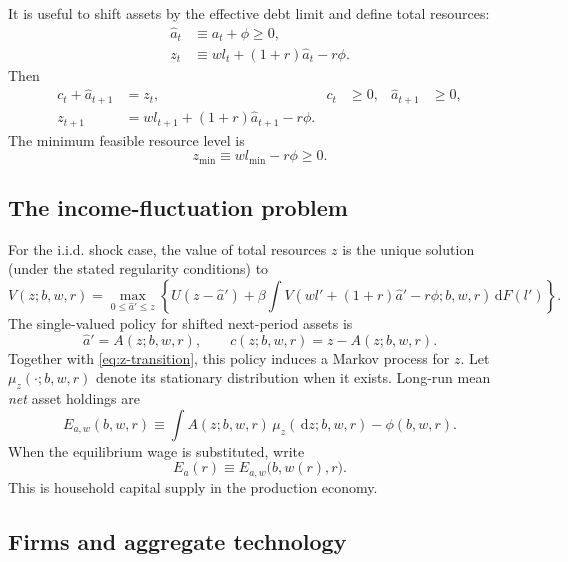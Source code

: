 \documentclass[11pt]{article}
\theoremstyle{propertystyle}
\newcommand{\1}{\mathbf{1}}
\newcommand{\dd}{\,\mathrm{d}}
\begin{document}
It is useful to shift assets by the effective debt limit and define total
resources:
\begin{align}
  \widehat a_t&\equiv a_t+\phi\geq0, \label{eq:ahat}\\
  z_t&\equiv w l_t+(1+r)\widehat a_t-r\phi. \label{eq:z}
\end{align}
Then
\begin{align}
  c_t+\widehat a_{t+1}&=z_t,
  &c_t&\geq0,&\widehat a_{t+1}&\geq0, \label{eq:shifted-budget}\\
  z_{t+1}&=w l_{t+1}+(1+r)\widehat a_{t+1}-r\phi. \label{eq:z-transition}
\end{align}
The minimum feasible resource level is
\begin{equation}
  z_{\min}\equiv w l_{\min}-r\phi\geq0.
  \label{eq:zmin}
\end{equation}

\subsection{The income-fluctuation problem}

For the i.i.d. shock case, the value of total resources $z$ is the unique
solution (under the stated regularity conditions) to
\begin{equation}
  V(z;b,w,r)=
  \max_{0\leq\widehat a'\leq z}
  \left\{
    U(z-\widehat a')+
    \beta\int V\!\left(wl'+(1+r)\widehat a'-r\phi;b,w,r\right)
      \dd F(l')
  \right\}.
  \label{eq:bellman}
\end{equation}
The single-valued policy for shifted next-period assets is
\begin{equation}
  \widehat a'=A(z;b,w,r),
  \qquad c(z;b,w,r)=z-A(z;b,w,r).
  \label{eq:policies}
\end{equation}
Together with \cref{eq:z-transition}, this policy induces a Markov process for
$z$.  Let $\mu_z(\cdot;b,w,r)$ denote its stationary distribution when it
exists.  Long-run mean \emph{net} asset holdings are
\begin{equation}
  E_{a,w}(b,w,r)
  \equiv
  \int A(z;b,w,r)\,\mu_z(\dd z;b,w,r)-\phi(b,w,r).
  \label{eq:Eaw}
\end{equation}
When the equilibrium wage is substituted, write
\begin{equation}
  E_a(r)\equiv E_{a,w}\bigl(b,w(r),r\bigr).
  \label{eq:Ea}
\end{equation}
This is household capital supply in the production economy.

\subsection{Firms and aggregate technology}
\end{document}
